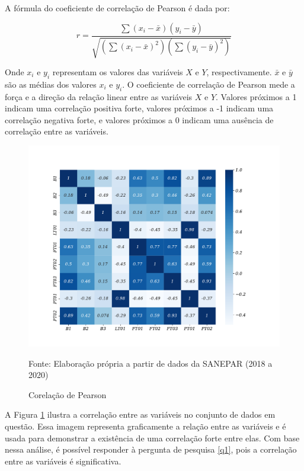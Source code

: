 A fórmula do coeficiente de correlação de Pearson é dada por:

\begin{equation}
	r=\frac{\sum\left(x_i-\bar{x}\right)\left(y_i-\bar{y}\right)}{\sqrt{\left(\sum\left(x_i-\bar{x}\right)^2\right)\left(\sum\left(y_i-\bar{y}\right)^2\right)}}
\end{equation}

Onde $x_i$ e $y_i$ representam os valores das variáveis $X$ e $Y$, respectivamente. $\bar{x}$ e $\bar{y}$ são as médias dos valores $x_i$ e $y_i$. O coeficiente de correlação de Pearson mede a força e a direção da relação linear entre as variáveis $X$ e $Y$. Valores próximos a 1 indicam uma correlação positiva forte, valores próximos a -1 indicam uma correlação negativa forte, e valores próximos a 0 indicam uma ausência de correlação entre as variáveis.

\begin{figure}[H]
	\centering
	\caption{Corelação de Pearson}
	\label{fig:person}
	\includegraphics[width=0.9\linewidth]{Apendices/Figuras/modelagem-24h/person}
	
	Fonte: Elaboração própria a partir de dados da SANEPAR (2018 a 2020)
\end{figure}

A Figura \ref{fig:person} ilustra a correlação entre as variáveis no conjunto de dados em questão. Essa imagem representa graficamente a relação entre as variáveis e é usada para demonstrar a existência de uma correlação forte entre elas. Com base nessa análise, é possível responder à pergunta de pesquisa \ref{q1}, pois a correlação entre as variáveis é significativa.

